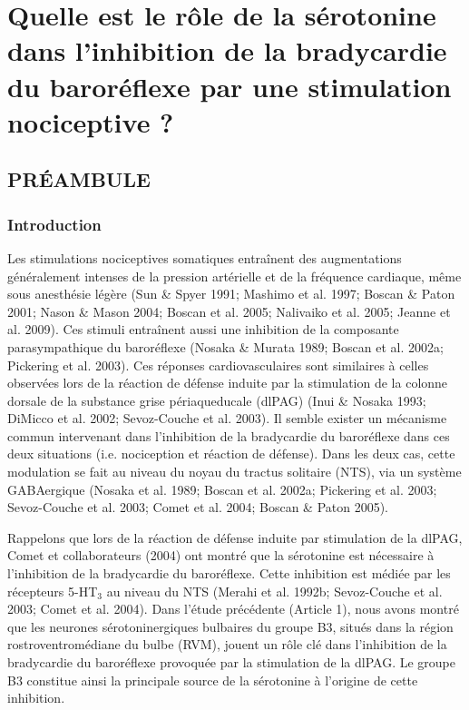 \documentclass[a4paper,12pt,twoside]{report}
\begin{document}
\cleardoublepage

\fancyhf{} %
\fancyfoot[C]{\bfseries -\thepage-}
\fancyhead[RO]{\bfseries\rightmark}
\renewcommand{\headrulewidth}{1pt}
\renewcommand{\footrulewidth}{1pt}
\addtolength{\headheight}{1pt} %

\chapter{Quelle est le rôle de la sérotonine dans l’inhibition de la bradycardie du baroréflexe par une stimulation nociceptive ?}

\section{PRÉAMBULE}

\subsection{Introduction}

Les stimulations nociceptives somatiques entraînent des augmentations généralement intenses de la pression artérielle et de la fréquence cardiaque, même sous anesthésie légère (Sun \& Spyer 1991; Mashimo et al. 1997; Boscan \& Paton 2001; Nason \& Mason 2004; Boscan et al. 2005; Nalivaiko et al. 2005; Jeanne et al. 2009). Ces stimuli entraînent aussi une inhibition de la composante parasympathique du baroréflexe (Nosaka \& Murata 1989; Boscan et al. 2002a; Pickering et al. 2003). Ces réponses cardiovasculaires sont similaires à celles observées lors de la réaction de défense induite par la stimulation de la colonne dorsale de la substance grise périaqueducale (dlPAG) (Inui \& Nosaka 1993; DiMicco et al. 2002; Sevoz-Couche et al. 2003). Il semble exister un mécanisme commun intervenant dans l’inhibition de la bradycardie du baroréflexe dans ces deux situations (i.e. nociception et réaction de défense). Dans les deux cas, cette modulation se fait au niveau du noyau du tractus solitaire (NTS), via un système GABAergique (Nosaka et al. 1989; Boscan et al. 2002a; Pickering et al. 2003; Sevoz-Couche et al. 2003; Comet et al. 2004; Boscan \& Paton 2005).

Rappelons que lors de la réaction de défense induite par stimulation de la dlPAG, Comet et collaborateurs (2004) ont montré que la sérotonine est nécessaire à l’inhibition de la bradycardie du baroréflexe. Cette inhibition est médiée par les récepteurs 5-HT$_{3}$ au niveau du NTS (Merahi et al. 1992b; Sevoz-Couche et al. 2003; Comet et al. 2004). Dans l'étude précédente (Article 1), nous avons montré que les neurones sérotoninergiques bulbaires du groupe B3, situés dans la région rostroventromédiane du bulbe (RVM), jouent un rôle clé dans l’inhibition de la bradycardie du baroréflexe provoquée par la stimulation de la dlPAG. Le groupe B3 constitue ainsi la principale source de la sérotonine à l’origine de cette inhibition.
\end{document}
